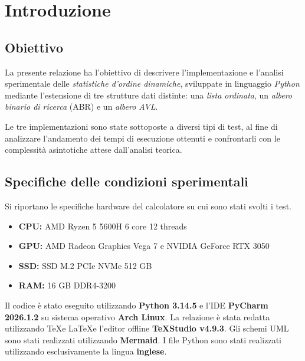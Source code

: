 \section{Introduzione}
\subsection{Obiettivo}
La presente relazione ha l'obiettivo di descrivere l'implementazione e l'analisi sperimentale delle \textit{statistiche d'ordine dinamiche}, sviluppate in linguaggio \textit{Python} mediante l'estensione di tre strutture dati distinte: una \textit{lista ordinata}, un \textit{albero binario di ricerca} (ABR) e un \textit{albero AVL}.

\medskip

Le tre implementazioni sono state sottoposte a diversi tipi di test, al fine di analizzare l'andamento dei tempi di esecuzione ottenuti e confrontarli con le complessità asintotiche attese dall'analisi teorica.

\subsection{Specifiche delle condizioni sperimentali}
Si riportano le specifiche hardware del calcolatore su cui sono stati svolti i test.
\begin{itemize}
	\item \textbf{CPU:} AMD Ryzen 5 5600H 6 core 12 threads
	\item \textbf{GPU:} AMD Radeon Graphics Vega 7 e NVIDIA GeForce RTX 3050
	\item \textbf{SSD:}	SSD M.2 PCIe NVMe 512 GB
	\item \textbf{RAM:} 16 GB DDR4-3200
	
\end{itemize}

Il codice è stato eseguito utilizzando \textbf{Python 3.14.5} e l'IDE \textbf{PyCharm 2026.1.2} su sistema operativo \textbf{Arch Linux}. La relazione è stata redatta utilizzando \TeX e \LaTeX e l'editor offline \textbf{TeXStudio v4.9.3}. Gli schemi UML sono stati realizzati utilizzando \textbf{Mermaid}. I file Python sono stati realizzati utilizzando esclusivamente la lingua \textbf{inglese}.

\newpage